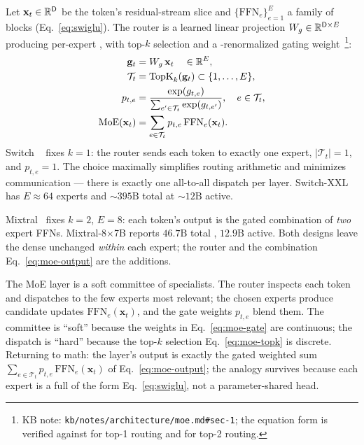 Let $\mathbf{x}_t \in \mathbb{R}^{\mathsf{D}}$ be the token's residual-stream
slice and $\{\mathrm{FFN}_e\}_{e=1}^{E}$ a family of  blocks
(Eq.~\eqref{eq:swiglu}). The router is a learned linear projection
$W_g \in \mathbb{R}^{\mathsf{D} \times E}$ producing per-expert , with
top-$k$ selection and a -renormalized gating
weight~\citep[\S 2.1]{fedus2021-switch}\footnote{KB note:
\texttt{kb/notes/architecture/moe.md\#sec-1}; the equation form is
verified against \citet{fedus2021-switch} for top-1 routing and
\citet{mixtral2024} for top-2 routing. }:
\begin{align}
  \mathbf{g}_t       &= W_g\, \mathbf{x}_t \quad\in\mathbb{R}^{E}, \label{eq:moe-router} \\
  \mathcal{T}_t      &= \mathrm{TopK}_k(\mathbf{g}_t) \subset \{1,\dots,E\}, \label{eq:moe-topk} \\
  p_{t,e}            &= \frac{\exp(g_{t,e})}{\sum_{e' \in \mathcal{T}_t} \exp(g_{t,e'})}, \quad e \in \mathcal{T}_t, \label{eq:moe-gate} \\
  \mathrm{MoE}(\mathbf{x}_t) &= \sum_{e \in \mathcal{T}_t} p_{t,e}\,\mathrm{FFN}_e(\mathbf{x}_t). \label{eq:moe-output}
\end{align}
Switch ~\citep{fedus2021-switch} fixes $k = 1$: the router
sends each token to exactly one expert, $|\mathcal{T}_t| = 1$, and
$p_{t,e} = 1$. The choice maximally simplifies routing arithmetic
and minimizes communication --- there is exactly one all-to-all
dispatch per layer. Switch-XXL has $E \approx 64$ experts and
$\sim\!395\mathrm{B}$ total  at $\sim\!12\mathrm{B}$ active.

Mixtral~\citep{mixtral2024} fixes $k = 2$, $E = 8$: each token's
output is the gated combination of \emph{two} expert FFNs.
Mixtral-8$\times$7B reports $46.7\mathrm{B}$ total ,
$12.9\mathrm{B}$ active. Both designs leave the dense
  unchanged \emph{within} each expert; the router and the
combination Eq.~\eqref{eq:moe-output} are the additions.

\begin{analogy}
The MoE layer is a soft committee of specialists. The router inspects
each token and dispatches to the few experts most relevant; the chosen
experts produce candidate updates $\mathrm{FFN}_e(\mathbf{x}_t)$, and
the gate weights $p_{t,e}$ blend them. The committee is ``soft''
because the weights in Eq.~\eqref{eq:moe-gate} are continuous; the
dispatch is ``hard'' because the top-$k$ selection
Eq.~\eqref{eq:moe-topk} is discrete. Returning to math: the layer's
output is exactly the gated weighted sum
$\sum_{e \in \mathcal{T}_t} p_{t,e}\,\mathrm{FFN}_e(\mathbf{x}_t)$
of Eq.~\eqref{eq:moe-output}; the analogy survives because each
expert is a full   of the form Eq.~\eqref{eq:swiglu}, not a
parameter-shared head.
\end{analogy}

